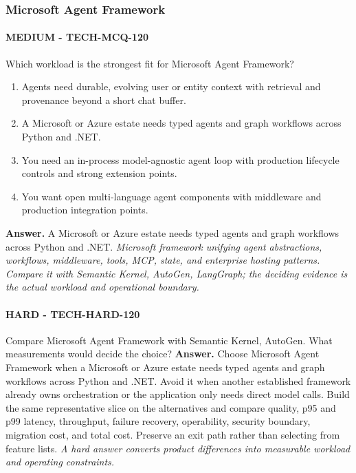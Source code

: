 \subsubsection*{Microsoft Agent Framework}
\paragraph{MEDIUM - TECH-MCQ-120} Which workload is the strongest fit for Microsoft Agent Framework?
\begin{enumerate}[label=\Alph*.]
\item Agents need durable, evolving user or entity context with retrieval and provenance beyond a short chat buffer.
\item A Microsoft or Azure estate needs typed agents and graph workflows across Python and .NET.
\item You need an in-process model-agnostic agent loop with production lifecycle controls and strong extension points.
\item You want open multi-language agent components with middleware and production integration points.
\end{enumerate}
\textbf{Answer.} A Microsoft or Azure estate needs typed agents and graph workflows across Python and .NET.
\textit{Microsoft framework unifying agent abstractions, workflows, middleware, tools, MCP, state, and enterprise hosting patterns. Compare it with Semantic Kernel, AutoGen, LangGraph; the deciding evidence is the actual workload and operational boundary.}
\paragraph{HARD - TECH-HARD-120} Compare Microsoft Agent Framework with Semantic Kernel, AutoGen. What measurements would decide the choice?
\textbf{Answer.} Choose Microsoft Agent Framework when a Microsoft or Azure estate needs typed agents and graph workflows across Python and .NET. Avoid it when another established framework already owns orchestration or the application only needs direct model calls. Build the same representative slice on the alternatives and compare quality, p95 and p99 latency, throughput, failure recovery, operability, security boundary, migration cost, and total cost. Preserve an exit path rather than selecting from feature lists.
\textit{A hard answer converts product differences into measurable workload and operating constraints.}
